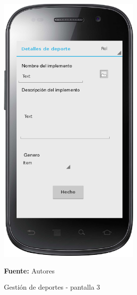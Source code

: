 \begin{figure}[!htb]
  \begin{center}
    \includegraphics[width=7cm]{./imagenes/UI/Deportes/gestion_deportes_3.png}
    \caption{Gestión de deportes - pantalla 3}
    \label{fig:gestion_deportes_3}
    \textbf{Fuente:}  Autores
  \end{center}
\end{figure}

